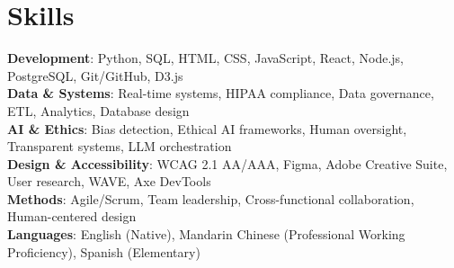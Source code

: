 \documentclass[letterpaper,11pt]{article}
\begin{document}
\section{Skills}
 \begin{itemize}[leftmargin=0.15in, label={}]
    \small{\item{
     \textbf{Development}: Python, SQL, HTML, CSS, JavaScript, React, Node.js, PostgreSQL, Git/GitHub, D3.js \\
     \textbf{Data \& Systems}: Real-time systems, HIPAA compliance, Data governance, ETL, Analytics, Database design \\
     \textbf{AI \& Ethics}: Bias detection, Ethical AI frameworks, Human oversight, Transparent systems, LLM orchestration \\
     \textbf{Design \& Accessibility}: WCAG 2.1 AA/AAA, Figma, Adobe Creative Suite, User research, WAVE, Axe DevTools \\
     \textbf{Methods}: Agile/Scrum, Team leadership, Cross-functional collaboration, Human-centered design \\
     \textbf{Languages}: English (Native), Mandarin Chinese (Professional Working Proficiency), Spanish (Elementary)
    }}
 \end{itemize}

\end{document}
